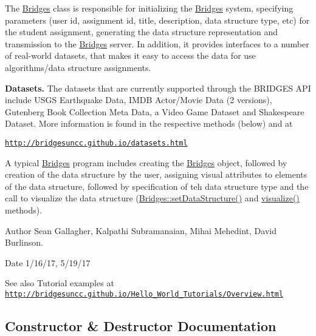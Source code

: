 The \hyperlink{classbridges_1_1connect_1_1_bridges}{Bridges} class is responsible for initializing the \hyperlink{classbridges_1_1connect_1_1_bridges}{Bridges} system, specifying parameters (user id, assignment id, title, description, data structure type, etc) for the student assignment, generating the data structure representation and transmission to the \hyperlink{classbridges_1_1connect_1_1_bridges}{Bridges} server. In addition, it provides interfaces to a number of real-\/world datasets, that makes it easy to access the data for use algorithms/data structure assignments. ~\newline


{\bfseries Datasets.} The datasets that are currently supported through the B\+R\+I\+D\+G\+E\+S A\+P\+I include U\+S\+G\+S Earthquake Data, I\+M\+D\+B Actor/\+Movie Data (2 versions), Gutenberg Book Collection Meta Data, a Video Game Dataset and Shakespeare Dataset. More information is found in the respective methods (below) and at 

\href{http://bridgesuncc.github.io/datasets.html}{\tt http\+://bridgesuncc.\+github.\+io/datasets.\+html} 

A typical \hyperlink{classbridges_1_1connect_1_1_bridges}{Bridges} program includes creating the \hyperlink{classbridges_1_1connect_1_1_bridges}{Bridges} object, followed by creation of the data structure by the user, assigning visual attributes to elements of the data structure, followed by specification of teh data structure type and the call to visualize the data structure (\hyperlink{classbridges_1_1connect_1_1_bridges_a921a6603b2445b1abe30a1b3d6f0c255}{Bridges\+::set\+Data\+Structure()} and \hyperlink{classbridges_1_1connect_1_1_bridges_a1853d64ffb8675ba2ec227a2b819cd24}{visualize()} methods).

\begin{DoxyAuthor}{Author}
Sean Gallagher, Kalpathi Subramanaian, Mihai Mehedint, David Burlinson.
\end{DoxyAuthor}
\begin{DoxyDate}{Date}
1/16/17, 5/19/17
\end{DoxyDate}
\begin{DoxySeeAlso}{See also}
Tutorial examples at ~\newline
 \href{http://bridgesuncc.github.io/Hello_World_Tutorials/Overview.html}{\tt http\+://bridgesuncc.\+github.\+io/\+Hello\+\_\+\+World\+\_\+\+Tutorials/\+Overview.\+html} 
\end{DoxySeeAlso}


\subsection{Constructor \& Destructor Documentation}
\hypertarget{classbridges_1_1connect_1_1_bridges_a42f0592841a829f93453506c78951b1f}{}

